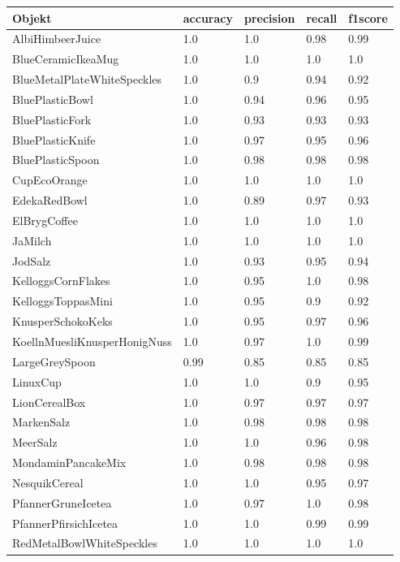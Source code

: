 \begin{table}
\begin{tabularx}{\textwidth}{Xllll}
\textbf{Objekt}	& \textbf{\gls{accuracy}} & \textbf{\gls{precision}}	& \textbf{\gls{recall}}	& \textbf{\gls{f1score}} \\ \hline
AlbiHimbeerJuice & 1.0 & 1.0 & 0.98 & 0.99 \\  
BlueCeramicIkeaMug & 1.0 & 1.0 & 1.0 & 1.0 \\  
BlueMetalPlateWhiteSpeckles & 1.0 & 0.9 & 0.94 & 0.92 \\  
BluePlasticBowl & 1.0 & 0.94 & 0.96 & 0.95 \\  
BluePlasticFork & 1.0 & 0.93 & 0.93 & 0.93 \\  
BluePlasticKnife & 1.0 & 0.97 & 0.95 & 0.96 \\  
BluePlasticSpoon & 1.0 & 0.98 & 0.98 & 0.98 \\  
CupEcoOrange & 1.0 & 1.0 & 1.0 & 1.0 \\  
EdekaRedBowl & 1.0 & 0.89 & 0.97 & 0.93 \\  
ElBrygCoffee & 1.0 & 1.0 & 1.0 & 1.0 \\  
JaMilch & 1.0 & 1.0 & 1.0 & 1.0 \\  
JodSalz & 1.0 & 0.93 & 0.95 & 0.94 \\  
KelloggsCornFlakes & 1.0 & 0.95 & 1.0 & 0.98 \\  
KelloggsToppasMini & 1.0 & 0.95 & 0.9 & 0.92 \\  
KnusperSchokoKeks & 1.0 & 0.95 & 0.97 & 0.96 \\  
KoellnMuesliKnusperHonigNuss & 1.0 & 0.97 & 1.0 & 0.99 \\  
LargeGreySpoon & 0.99 & 0.85 & 0.85 & 0.85 \\  
LinuxCup & 1.0 & 1.0 & 0.9 & 0.95 \\  
LionCerealBox & 1.0 & 0.97 & 0.97 & 0.97 \\  
MarkenSalz & 1.0 & 0.98 & 0.98 & 0.98 \\  
MeerSalz & 1.0 & 1.0 & 0.96 & 0.98 \\  
MondaminPancakeMix & 1.0 & 0.98 & 0.98 & 0.98 \\  
NesquikCereal & 1.0 & 1.0 & 0.95 & 0.97 \\  
PfannerGruneIcetea & 1.0 & 0.97 & 1.0 & 0.98 \\  
PfannerPfirsichIcetea & 1.0 & 1.0 & 0.99 & 0.99 \\  
RedMetalBowlWhiteSpeckles & 1.0 & 1.0 & 1.0 & 1.0 \\  

\end{tabularx}
\end{table}
